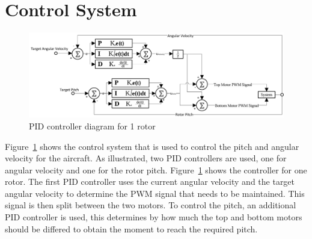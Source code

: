             \section{Control System}
            \begin{figure} [h]               
                \centering
                \includegraphics*[width = \textwidth]{figs/Software/PID_Control.png}
                \caption{PID controller diagram for 1 rotor}
                \label{fig: pid_diagram}
            \end{figure}
            Figure~\ref{fig: pid_diagram} shows the control system that is used to control the pitch and angular velocity for the aircraft. As illustrated, two PID controllers are used, one for angular velocity and one for the rotor pitch. Figure~\ref{fig: pid_diagram} shows the controller for one rotor. The first PID controller uses the current angular velocity and the target angular velocity to determine the PWM signal that needs to be maintained. This signal is then split between the two motors. To control the pitch, an additional PID controller is used, this determines by how much the top and bottom motors should be differed to obtain the moment to reach the required pitch. 